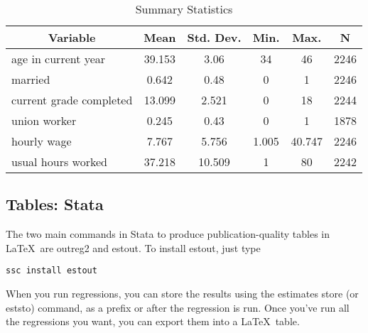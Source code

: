 \documentclass{article}
\begin{document}


\begin{table}[htbp]\centering \caption{Summary Statistics \label{sumstat}}
	\begin{tabular}{l c c c c c}\hline\hline
		\multicolumn{1}{c}{\textbf{Variable}} & \textbf{Mean}
		& \textbf{Std. Dev.}& \textbf{Min.} &  \textbf{Max.} & \textbf{N}\\ \hline
		age in current year & 39.153 & 3.06 & 34 & 46 & 2246\\
		married & 0.642 & 0.48 & 0 & 1 & 2246\\
		current grade completed & 13.099 & 2.521 & 0 & 18 & 2244\\
		union worker & 0.245 & 0.43 & 0 & 1 & 1878\\
		hourly wage & 7.767 & 5.756 & 1.005 & 40.747 & 2246\\
		usual hours worked & 37.218 & 10.509 & 1 & 80 & 2242\\
		\hline
	\end{tabular}
\end{table}
\clearpage
\subsection{Tables: Stata}

The two main commands in Stata to produce publication-quality tables in \LaTeX\ are outreg2 and estout. To install estout, just type
\begin{verbatim}
ssc install estout
\end{verbatim}

When you run regressions, you can store the results using the estimates store (or eststo) command, as a prefix or after the regression is run. Once you've run all the regressions you want, you can export them into a \LaTeX\ table. 
\end{document}
